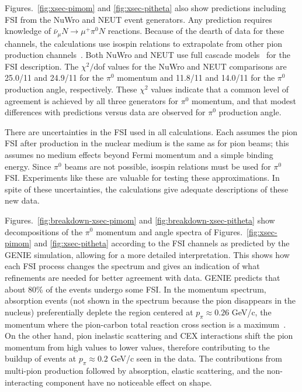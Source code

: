Figures.~\ref{fig:xsec-pimom} and \ref{fig:xsec-pitheta} also show 
predictions including FSI from the NuWro and NEUT event generators.
Any prediction requires knowledge of $\bar{\nu}_\mu N \rightarrow \mu^+ \pi^0 N$ reactions.  
Because of the dearth of data for these channels, the calculations use isospin relations 
to extrapolate from other pion production channels~\cite{Rein:1980wg,Graczyk:2009qm}. 
Both NuWro and NEUT use full cascade models~\cite{Salcedo:1987md} for the FSI description. 
The $\chi^2/$dof values for the NuWro and NEUT comparisons are 25.0/11 
and 24.9/11  for the $\pi^0$ momentum and 11.8/11 and 14.0/11 for the 
$\pi^0$ production angle, respectively. These $\chi^2$ values indicate that a 
common level of agreement is achieved by all three generators 
for $\pi^0$ momentum, and that modest differences with predictions 
versus data are observed for $\pi^0$ production angle.

There are uncertainties in the FSI used in all calculations.  Each assumes the pion FSI
after production in the nuclear medium is the same as for pion beams; this assumes
no medium effects beyond Fermi momentum and a simple binding energy.  Since
$\pi^0$ beams are not possible, isospin relations must be used for $\pi^0$ FSI.
Experiments like these are valuable for testing these approximations.  In spite of
these uncertainties, the calculations give adequate descriptions of these new data.

Figures.~\ref{fig:breakdown-xsec-pimom} and \ref{fig:breakdown-xsec-pitheta} 
show decompositions of the $\pi^0$ momentum and angle spectra of
Figures.~\ref{fig:xsec-pimom} and \ref{fig:xsec-pitheta} according 
to the FSI channels as predicted by the GENIE simulation, allowing for a more detailed 
interpretation.  This shows how each FSI process changes the spectrum and gives
an indication of what refinements are needed for better agreement with data.
GENIE predicts that about 80\% of the events undergo some FSI.  In the momentum spectrum, absorption events (not shown 
in the spectrum because the pion disappears in the nucleus) 
preferentially deplete the region centered at $p_\pi \approx 0.26$ GeV/c, the momentum where the
pion-carbon total reaction cross section is a maximum~\cite{Lee:2002eq}.  On the other
hand, pion inelastic 
scattering and CEX interactions shift the pion momentum from high values to 
lower values, therefore contributing to the buildup of events at 
$p_\pi \approx 0.2$ GeV/c seen in the data.  The contributions from multi-pion production followed 
by absorption, elastic scattering, and the non-interacting
component have no noticeable effect on shape.  

